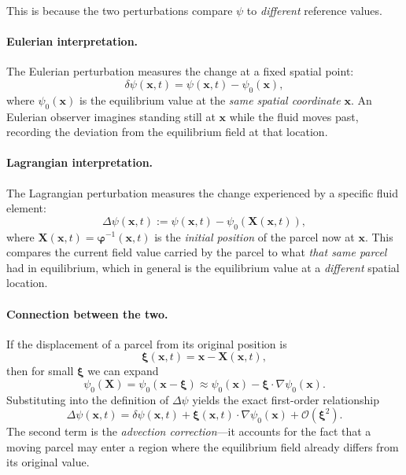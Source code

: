 This is because the two perturbations compare $\psi$ to \emph{different} reference values.

\paragraph{Eulerian interpretation.} 
The Eulerian perturbation measures the change at a fixed spatial point:
\[
\delta \psi(\mathbf{x},t) 
= \psi(\mathbf{x},t) - \psi_0(\mathbf{x}),
\]
where $\psi_0(\mathbf{x})$ is the equilibrium value at the \emph{same spatial coordinate} $\mathbf{x}$. An Eulerian observer imagines standing still at $\mathbf{x}$ while the fluid moves past, recording the deviation from the equilibrium field at that location.

\paragraph{Lagrangian interpretation.} 
The Lagrangian perturbation measures the change experienced by a specific fluid element:
\[
\Delta \psi(\mathbf{x},t) 
:= \psi(\mathbf{x},t) - \psi_0(\mathbf{X}(\mathbf{x},t)),
\]
where $\mathbf{X}(\mathbf{x},t) = \boldsymbol{\varphi}^{-1}(\mathbf{x},t)$ is the \emph{initial position} of the parcel now at $\mathbf{x}$. This compares the current field value carried by the parcel to what \emph{that same parcel} had in equilibrium, which in general is the equilibrium value at a \emph{different} spatial location.

\paragraph{Connection between the two.}
If the displacement of a parcel from its original position is 
\[
\boldsymbol{\xi}(\mathbf{x},t) = \mathbf{x} - \mathbf{X}(\mathbf{x},t),
\]
then for small $\boldsymbol{\xi}$ we can expand
\[
\psi_0(\mathbf{X}) 
= \psi_0(\mathbf{x} - \boldsymbol{\xi}) 
\approx \psi_0(\mathbf{x}) - \boldsymbol{\xi} \cdot \nabla \psi_0(\mathbf{x}).
\]
Substituting into the definition of $\Delta\psi$ yields the exact first-order relationship
\begin{equation}
\label{eq:lag_eul_relation}
\Delta \psi(\mathbf{x},t) 
= \delta \psi(\mathbf{x},t) 
+ \boldsymbol{\xi}(\mathbf{x},t) \cdot \nabla \psi_0(\mathbf{x}) 
+ \mathcal{O}(\boldsymbol{\xi}^2).
\end{equation}
The second term is the \emph{advection correction}---it accounts for the fact that a moving parcel may enter a region where the equilibrium field already differs from its original value. 

